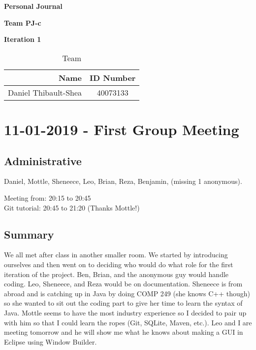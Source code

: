 \documentclass[12pt]{article}
\begin{document}
\vspace*{0.5in}
\centerline{\bf\Large Personal Journal}

\vspace*{0.5in}
\centerline{\bf\Large Team PJ-c}
\vspace*{0.25in}
\centerline{\bf\Large Iteration 1}


\vspace*{1.5in}
\begin{table}[htbp]
\caption{Team}
\begin{center}
\begin{tabular}{|r | c|}
\hline
Name & ID Number \\
\hline\hline
Daniel Thibault-Shea & 40073133 \\
\hline
\end{tabular}
\end{center}
\end{table}

\clearpage

\section{11-01-2019 - First Group Meeting}

\subsection{Administrative}
Daniel, Mottle, Sheneece, Leo, Brian, Reza, Benjamin, (missing 1 anonymous).

Meeting from: 20:15 to 20:45\\
Git tutorial: 20:45 to 21:20 (Thanks Mottle!)

\subsection{Summary}
We all met after class in another smaller room. We started by introducing ourselves and then went on to deciding who would do what role for the first iteration of the project. Ben, Brian, and the anonymous guy would handle coding. Leo, Sheneece, and Reza would be on documentation. Sheneece is from abroad and is catching up in Java by doing COMP 249 (she knows C++ though) so she wanted to sit out the coding part to give her time to learn the syntax of Java. Mottle seems to have the most industry experience so I decided to pair up with him so that I could learn the ropes (Git, SQLite, Maven, etc.). Leo and I are meeting tomorrow and he will show me what he knows about making a GUI in Eclipse using Window Builder.
\end{document}
